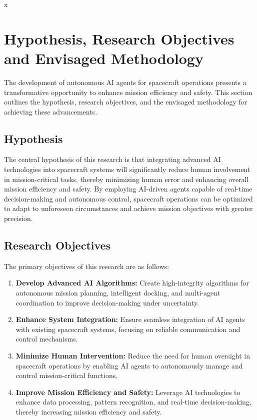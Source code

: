 \documentclass[a4paper,12pt]{article}
\begin{document}
x
\section{Hypothesis, Research Objectives and Envisaged Methodology}

The development of autonomous AI agents for spacecraft operations presents a transformative opportunity to enhance mission efficiency and safety. This section outlines the hypothesis, research objectives, and the envisaged methodology for achieving these advancements.

\subsection{Hypothesis}

The central hypothesis of this research is that integrating advanced AI technologies into spacecraft systems will significantly reduce human involvement in mission-critical tasks, thereby minimizing human error and enhancing overall mission efficiency and safety. By employing AI-driven agents capable of real-time decision-making and autonomous control, spacecraft operations can be optimized to adapt to unforeseen circumstances and achieve mission objectives with greater precision.

\subsection{Research Objectives}

The primary objectives of this research are as follows:

\begin{enumerate}
    \item \textbf{Develop Advanced AI Algorithms:} Create high-integrity algorithms for autonomous mission planning, intelligent docking, and multi-agent coordination to improve decision-making under uncertainty.
    \item \textbf{Enhance System Integration:} Ensure seamless integration of AI agents with existing spacecraft systems, focusing on reliable communication and control mechanisms.
    \item \textbf{Minimize Human Intervention:} Reduce the need for human oversight in spacecraft operations by enabling AI agents to autonomously manage and control mission-critical functions.
    \item \textbf{Improve Mission Efficiency and Safety:} Leverage AI technologies to enhance data processing, pattern recognition, and real-time decision-making, thereby increasing mission efficiency and safety.
\end{enumerate}
\end{document}
